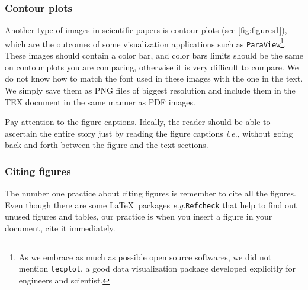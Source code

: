 \documentclass[authoryear,3p,times,preprint,review,fleqn]{elsarticle}
\newcommand{\eg}{\textit{e.g.}\xspace}
\newcommand{\ie}{\textit{i.e.},\xspace}
\numberwithin{equation}{section}
\theoremstyle{remark}
\begin{document}
\begin{figure}[!h]
\begin{snippetlatex}[caption={\texttt{TikZ} code used to obtain \cref{fig:tikz}.},label={snippet_code_tikz},framerule=1pt,tabsize=3]
  \end{snippetlatex}
\end{figure}



\subsubsection{Contour plots}\label{sec:contours}

Another type of images in scientific papers is contour plots (see \cref{fig:figures1}), which are the outcomes of some visualization applications such as \texttt{ParaView}\footnote{As we embrace as much as possible open source softwares, we did not mention \texttt{tecplot},  a good data visualization package developed explicitly for engineers and scientist.}. These images should contain a color bar, and color bars limits should be the same on contour plots you are comparing, otherwise it is very difficult to compare. We do not know how to match the font used in these images with the one in the text. We simply save them as PNG files of biggest resolution and include them in the TEX document in the same manner as PDF images.

 Pay attention to the figure captions. Ideally, the reader should be able to ascertain the entire story just by reading the figure captions \ie without going back and forth between the figure and the text sections.

 \subsubsection{Citing figures}\label{sec:citing-figs}

 The number one practice about citing figures is remember to cite all the figures. Even though there are some \LaTeX\ packages \eg \texttt{Refcheck} that help to find out unused figures and tables, our practice is when you insert a figure in your document, cite it immediately.
\end{document}
